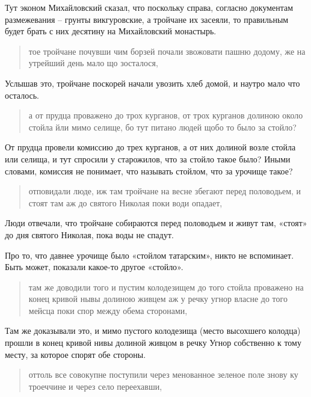 Тут эконом Михайловский сказал, что поскольку справа, согласно документам размежевания – грунты викгуровские, а тройчане их засеяли, то правильным будет брать с них десятину на Михайловский монастырь.

\begin{quotation}
тое тройчане почувши чим борзей почали звожовати пашню додому, же на утрейший день мало що зосталося, 
\end{quotation}

Услышав это, тройчане поскорей начали увозить хлеб домой, и наутро мало что осталось.

\begin{quotation}
а от прудца проважено до трох курганов, от трох курганов долиною около стойла йли мимо селище, бо тут питано людей щобо то было за стойло?
\end{quotation}

От прудца провели комиссию до трех курганов, а от них долиной возле стойла или селища, и тут спросили у старожилов, что за стойло такое было? Иными словами, комиссия не понимает, что называть стойлом, что за урочище такое?

\begin{quotation}
отповидали люде, иж там тройчане на весне збегают перед половодьем, и стоят там аж до святого Николая поки води опадает, 
\end{quotation}

Люди отвечали, что тройчане собираются перед половодьем и живут там, «стоят» до дня святого Николая, пока воды не спадут.

Про то, что давнее урочище было «стойлом татарским», никто не вспоминает. Быть может, показали какое-то другое «стойло».

\begin{quotation}
там же доводили того и пустим колодезищем до того стойла проважено на конец кривой нывы долиною живцем аж у речку угнор власне до того мейсца поки спор между обема сторонами, 
\end{quotation}

Там же доказывали это, и мимо пустого колодезища (место высохшего колодца) прошли в конец кривой нивы долиной живцом в речку Угнор собственно к тому месту, за которое спорят обе стороны.

\begin{quotation}
оттоль все совокупне поступили через менованное зеленое поле знову ку троеччине и через село переехавши, 
\end{quotation}

